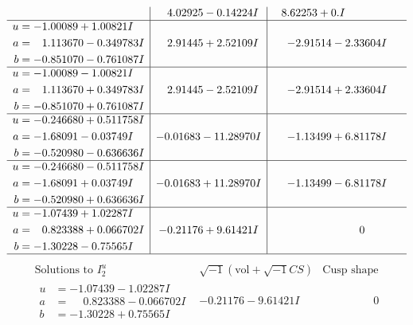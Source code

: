 \documentclass[1p]{elsarticle_modified}
\theoremstyle{definition}
\newcommand{\I}{\sqrt{-1}}
\begin{document}
$$\begin{array}{c|c|c}
 & \phantom{-}4.02925 - 0.14224 I & \phantom{-}8.62253 + 0. I\phantom{ +0.000000I} \\ \hline\begin{aligned}
u &= -1.00089 + 1.00821 I \\
a &= \phantom{-}1.113670 - 0.349783 I \\
b &= -0.851070 - 0.761087 I\end{aligned}
 & \phantom{-}2.91445 + 2.52109 I & -2.91514 - 2.33604 I \\ \hline\begin{aligned}
u &= -1.00089 - 1.00821 I \\
a &= \phantom{-}1.113670 + 0.349783 I \\
b &= -0.851070 + 0.761087 I\end{aligned}
 & \phantom{-}2.91445 - 2.52109 I & -2.91514 + 2.33604 I \\ \hline\begin{aligned}
u &= -0.246680 + 0.511758 I \\
a &= -1.68091 - 0.03749 I \\
b &= -0.520980 - 0.636636 I\end{aligned}
 & -0.01683 - 11.28970 I & -1.13499 + 6.81178 I \\ \hline\begin{aligned}
u &= -0.246680 - 0.511758 I \\
a &= -1.68091 + 0.03749 I \\
b &= -0.520980 + 0.636636 I\end{aligned}
 & -0.01683 + 11.28970 I & -1.13499 - 6.81178 I \\ \hline\begin{aligned}
u &= -1.07439 + 1.02287 I \\
a &= \phantom{-}0.823388 + 0.066702 I \\
b &= -1.30228 - 0.75565 I\end{aligned}
 & -0.21176 + 9.61421 I & \phantom{-0.000000 } 0\\
 \hline 
 \end{array}$$\newpage$$\begin{array}{c|c|c}  
\text{Solutions to }I^u_{2}& \I (\text{vol} + \sqrt{-1}CS) & \text{Cusp shape}\\
 \hline 
\begin{aligned}
u &= -1.07439 - 1.02287 I \\
a &= \phantom{-}0.823388 - 0.066702 I \\
b &= -1.30228 + 0.75565 I\end{aligned}
 & -0.21176 - 9.61421 I & \phantom{-0.000000 } 0 \\ \hline\begin{aligned}

\end{aligned}
\end{array}$$
\end{document}
